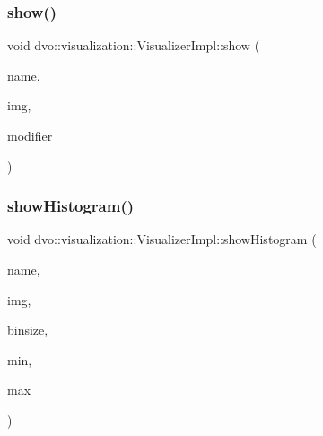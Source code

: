 \subsubsection{\texorpdfstring{show()}{show()}}
{\footnotesize\ttfamily void dvo\+::visualization\+::\+Visualizer\+Impl\+::show (\begin{DoxyParamCaption}\item[{std\+::string \&}]{name,  }\item[{const cv\+::\+Mat\+Expr \&}]{img,  }\item[{\mbox{\hyperlink{classdvo_1_1visualization_1_1_visualizer_ac33e0b53e7ef7be64e3230f6c91084a0}{Visualizer\+::\+Image\+Modifier}}}]{modifier }\end{DoxyParamCaption})\hspace{0.3cm}{\ttfamily [inline]}}

\mbox{\label{classdvo_1_1visualization_1_1_visualizer_impl_a3afe414ca4a899c77458a1a0f1139dbc}} 
\subsubsection{\texorpdfstring{show\+Histogram()}{showHistogram()}}
{\footnotesize\ttfamily void dvo\+::visualization\+::\+Visualizer\+Impl\+::show\+Histogram (\begin{DoxyParamCaption}\item[{std\+::string \&}]{name,  }\item[{const cv\+::\+Mat \&}]{img,  }\item[{float}]{binsize,  }\item[{float}]{min,  }\item[{float}]{max }\end{DoxyParamCaption})\hspace{0.3cm}{\ttfamily [inline]}}

\mbox{\label{classdvo_1_1visualization_1_1_visualizer_impl_acc30618615be0c6b9d54959a1beaf5e7}} 
